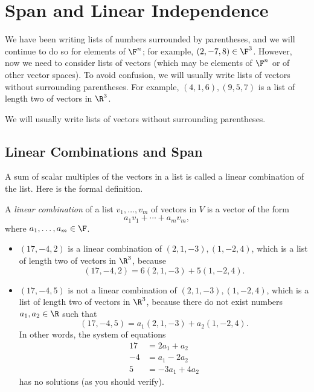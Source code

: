 \providecommand\axeqnum[1]{\refstepcounter{theorem}\tag*{\thetheorem}\label{ax:#1}}
\section{Span and Linear Independence}

We have been writing lists of numbers surrounded by parentheses, and we will
continue to do so for elements of $\F^n$; for example, $(2,-7,8)\in\F^3$.
However, now we need to consider lists of vectors (which may be elements of
$\F^n$ or of other vector spaces). To avoid confusion, we will usually write
lists of vectors without surrounding parentheses. For example,
$(4,1,6),(9,5,7)$ is a list of length two of vectors in $\R^3$.

\begin{notation}\label{ax:2.1}
We will usually write lists of vectors without surrounding parentheses.
\end{notation}

\subsection{Linear Combinations and Span}

A sum of scalar multiples of the vectors in a list is called a linear
combination of the list. Here is the formal definition.

\begin{definition}\label{ax:2.2}
A \emph{linear combination} of a list $v_1,\dots,v_m$ of vectors in $V$ is a
vector of the form
\[ a_1v_1+\cdots+a_mv_m, \]
where $a_1,\dots,a_m\in\F$.
\end{definition}

\begin{example}\label{ax:2.3}\leavevmode
\begin{itemize}
\item $(17,-4,2)$ is a linear combination of $(2,1,-3),(1,-2,4)$, which is a
  list of length two of vectors in $\R^3$, because
  \[ (17,-4,2) = 6(2,1,-3)+5(1,-2,4). \]
\item $(17,-4,5)$ is not a linear combination of $(2,1,-3),(1,-2,4)$, which is
  a list of length two of vectors in $\R^3$, because there do not exist numbers
  $a_1,a_2\in\R$ such that
  \[ (17,-4,5) = a_1(2,1,-3)+a_2(1,-2,4). \]
  In other words, the system of equations
  \begin{align*}
    17 &= 2a_1+a_2\\
    -4 &= a_1-2a_2\\
     5 &= -3a_1+4a_2
  \end{align*}
  has no solutions (as you should verify).
\end{itemize}
\end{example}

